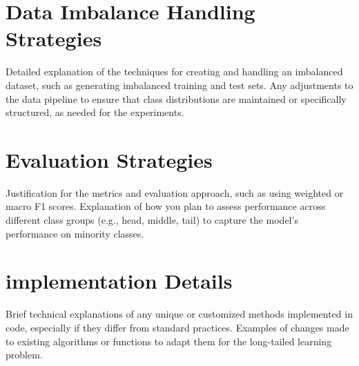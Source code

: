 \section{Data Imbalance Handling Strategies}
Detailed explanation of the techniques for creating and handling an imbalanced dataset, such as generating imbalanced training and test sets.
Any adjustments to the data pipeline to ensure that class distributions are maintained or specifically structured, as needed for the experiments.

\section{Evaluation Strategies}
Justification for the metrics and evaluation approach, such as using weighted or macro F1 scores.
Explanation of how you plan to assess performance across different class groups (e.g., head, middle, tail) to capture the model’s performance on minority classes.

\section{implementation Details}
Brief technical explanations of any unique or customized methods implemented in code, especially if they differ from standard practices.
Examples of changes made to existing algorithms or functions to adapt them for the long-tailed learning problem.

